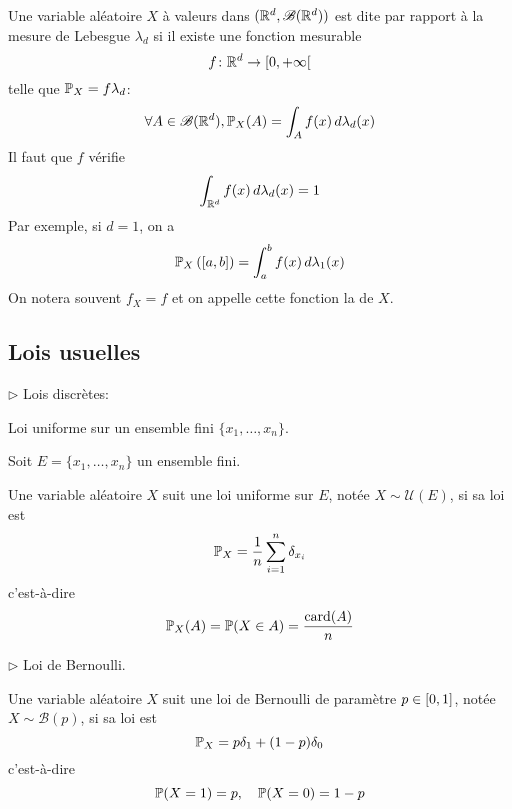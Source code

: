 \begin{definition}
    Une variable aléatoire \(X\) à valeurs dans \((\mathbb{R}^d, \mathscr{B}(\mathbb{R}^d))\) est dite  par rapport
    à la mesure de Lebesgue \(\lambda_d\) si il existe une fonction mesurable
    \begin{equation*}
        f\colon \mathbb{R}^d\to \mathopen{}\left[0,+\infty\right[\mathclose{}
    \end{equation*}
    telle que \(\mathbb{P}_X = f\lambda_d\):
    \begin{equation*}
        \forall A\in\mathscr{B}(\mathbb{R}^d), \mathbb{P}_X(A) = \int_A f(x)\mathop{}\!{d}\lambda_d(x)
    \end{equation*}
    Il faut que \(f\) vérifie
    \begin{equation*}
        \int_{\mathbb{R}^d}f(x)\mathop{}\!{d}\lambda_d(x) = 1
    \end{equation*}
    Par exemple, si \(d=1\), on a
    \begin{equation*}
        \mathbb{P}_X\left(\mathopen{}\left[a,b\right]\mathclose{}\right) = \int_a^b f(x)\mathop{}\!{d}\lambda_1(x)
    \end{equation*}
    On notera souvent \(f_X = f\) et on appelle cette fonction la  de \(X\).
\end{definition}

\subsection{Lois usuelles}\label{subsubsec:2-2}


\(\triangleright\) Lois discrètes:

Loi uniforme sur un ensemble fini \(\{x_1,\dots,x_n\}\).

Soit \(E = \{x_1,\dots,x_n\}\) un ensemble fini. 

Une variable aléatoire \(X\) suit une loi uniforme sur \(E\), notée \(X\sim\mathcal U(E)\), si sa loi est
\begin{equation*}
    \mathbb{P}_X = \frac{1}{n}\sum_{i=1}^n\delta_{x_i}
\end{equation*}
c'est-à-dire
\begin{equation*}
    \mathbb{P}_X(A) = \mathbb{P}(X\in A) = \frac{\text{card}(A)}{n}
\end{equation*}


\(\triangleright\) Loi de Bernoulli.

Une variable aléatoire \(X\) suit une loi de Bernoulli de paramètre \(p\in\mathopen{}\left[0,1\right]\mathclose{}\), notée \(X\sim\mathcal B(p)\), si sa loi est
\begin{equation*}
    \mathbb{P}_X = p\delta_1 + (1-p)\delta_0
\end{equation*}
c'est-à-dire
\begin{equation*}
    \mathbb{P}(X=1) = p,\quad \mathbb{P}(X=0) = 1-p
\end{equation*}


